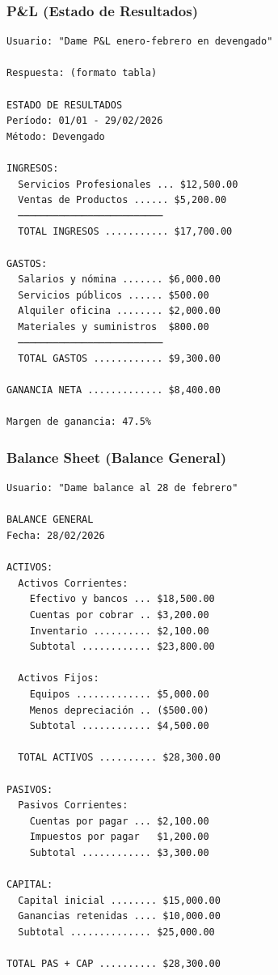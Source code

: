 \documentclass[12pt,oneside]{article}
\begin{document}
\subsubsection{P\&L (Estado de Resultados)}

\begin{verbatim}
Usuario: "Dame P&L enero-febrero en devengado"

Respuesta: (formato tabla)

ESTADO DE RESULTADOS
Período: 01/01 - 29/02/2026
Método: Devengado

INGRESOS:
  Servicios Profesionales ... $12,500.00
  Ventas de Productos ...... $5,200.00
  ─────────────────────────
  TOTAL INGRESOS ........... $17,700.00

GASTOS:
  Salarios y nómina ....... $6,000.00
  Servicios públicos ...... $500.00
  Alquiler oficina ........ $2,000.00
  Materiales y suministros  $800.00
  ─────────────────────────
  TOTAL GASTOS ............ $9,300.00

GANANCIA NETA ............. $8,400.00

Margen de ganancia: 47.5%
\end{verbatim}

\subsubsection{Balance Sheet (Balance General)}

\begin{verbatim}
Usuario: "Dame balance al 28 de febrero"

BALANCE GENERAL
Fecha: 28/02/2026

ACTIVOS:
  Activos Corrientes:
    Efectivo y bancos ... $18,500.00
    Cuentas por cobrar .. $3,200.00
    Inventario .......... $2,100.00
    Subtotal ............ $23,800.00
  
  Activos Fijos:
    Equipos ............. $5,000.00
    Menos depreciación .. ($500.00)
    Subtotal ............ $4,500.00

  TOTAL ACTIVOS .......... $28,300.00

PASIVOS:
  Pasivos Corrientes:
    Cuentas por pagar ... $2,100.00
    Impuestos por pagar   $1,200.00
    Subtotal ............ $3,300.00

CAPITAL:
  Capital inicial ........ $15,000.00
  Ganancias retenidas .... $10,000.00
  Subtotal .............. $25,000.00

TOTAL PAS + CAP .......... $28,300.00
\end{verbatim}
\end{document}
